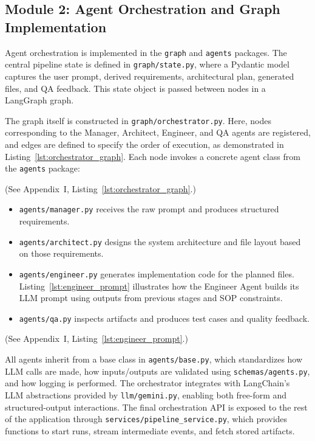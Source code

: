 \subsection*{Module 2: Agent Orchestration and Graph Implementation}

Agent orchestration is implemented in the \texttt{graph} and \texttt{agents} packages. The central pipeline state is defined in \texttt{graph/\allowbreak{}state.py}, where a Pydantic model captures the user prompt, derived requirements, architectural plan, generated files, and QA feedback. This state object is passed between nodes in a LangGraph graph.

The graph itself is constructed in \texttt{graph/\allowbreak{}orchestrator.py}. Here, nodes corresponding to the Manager, Architect, Engineer, and QA agents are registered, and edges are defined to specify the order of execution, as demonstrated in Listing~\ref{lst:orchestrator_graph}. Each node invokes a concrete agent class from the \texttt{agents} package:

(See Appendix~I, Listing~\ref{lst:orchestrator_graph}.)
\begin{itemize}
    \item \texttt{agents/\allowbreak{}manager.py} receives the raw prompt and produces structured requirements.
    \item \texttt{agents/\allowbreak{}architect.py} designs the system architecture and file layout based on those requirements.
    \item \texttt{agents/\allowbreak{}engineer.py} generates implementation code for the planned files. Listing~\ref{lst:engineer_prompt} illustrates how the Engineer Agent builds its LLM prompt using outputs from previous stages and SOP constraints.
    \item \texttt{agents/\allowbreak{}qa.py} inspects artifacts and produces test cases and quality feedback.
\end{itemize}

(See Appendix~I, Listing~\ref{lst:engineer_prompt}.)

All agents inherit from a base class in \texttt{agents/\allowbreak{}base.py}, which standardizes how LLM calls are made, how inputs/outputs are validated using \texttt{schemas/\allowbreak{}agents.py}, and how logging is performed. The orchestrator integrates with LangChain’s LLM abstractions provided by \texttt{llm/\allowbreak{}gemini.py}, enabling both free-form and structured-output interactions. The final orchestration API is exposed to the rest of the application through \texttt{services/\allowbreak{}pipeline\_\allowbreak{}service.py}, which provides functions to start runs, stream intermediate events, and fetch stored artifacts.

